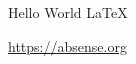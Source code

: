 \documentclass{article}
\begin{document}
Hello World \LaTeX

\url{https://absense.org}
\end{document}

